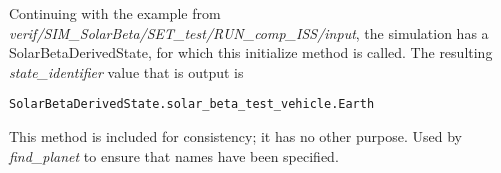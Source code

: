 \begin{itemize}
Continuing with the example from
\textit{verif/SIM\_SolarBeta/SET\_test/RUN\_comp\_ISS/input},
the simulation has a SolarBetaDerivedState, for which this initialize method is called.  The resulting \textit{state\_identifier} value that is output is
\begin{verbatim}
SolarBetaDerivedState.solar_beta_test_vehicle.Earth
\end{verbatim}
This method is included for consistency; it has no other purpose.
Used by \textit{find\_planet} to ensure that names have been specified.
\end{itemize}
